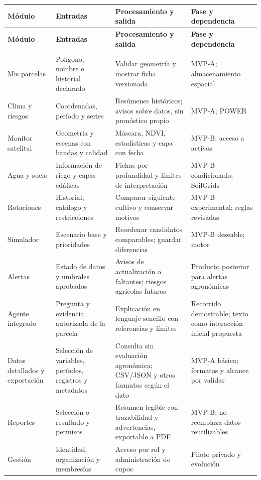 \documentclass[10pt,a4paper]{article}
\begin{document}
\begingroup\small
\begin{longtable}{>{\raggedright\arraybackslash}p{3.115cm}>{\raggedright\arraybackslash}p{3.582cm}>{\raggedright\arraybackslash}p{4.517cm}>{\raggedright\arraybackslash}p{4.361cm}}
\toprule
\textbf{Módulo} & \textbf{Entradas} & \textbf{Procesamiento y salida} & \textbf{Fase y dependencia} \\
\midrule\endfirsthead
\toprule
\textbf{Módulo} & \textbf{Entradas} & \textbf{Procesamiento y salida} & \textbf{Fase y dependencia} \\
\midrule\endhead
\midrule\multicolumn{4}{r}{\scriptsize Continúa en la página siguiente}\\\endfoot
\bottomrule\endlastfoot
Mis parcelas & Polígono, nombre e historial declarado & Validar geometría y mostrar ficha versionada & MVP-A; almacenamiento espacial \\[3pt]
Clima y riesgos & Coordenadas, período y series & Resúmenes históricos; avisos sobre datos, sin pronóstico propio & MVP-A; POWER \\[3pt]
Monitor satelital & Geometría y escenas con bandas y calidad & Máscara, NDVI, estadísticas y capa con fecha & MVP-B; acceso a activos \\[3pt]
Agua y suelo & Información de riego y capas edáficas & Fichas por profundidad y límites de interpretación & MVP-B condicionado; SoilGrids \\[3pt]
Rotaciones & Historial, catálogo y restricciones & Comparar siguiente cultivo y conservar motivos & MVP-B experimental; reglas revisadas \\[3pt]
Simulador & Escenario base y prioridades & Reordenar candidatos comparables; guardar diferencias & MVP-B deseable; motor \\[3pt]
Alertas & Estado de datos y umbrales aprobados & Avisos de actualización o faltantes; riesgos agrícolas futuros & Producto posterior para alertas agronómicas \\[3pt]
Agente integrado & Pregunta y evidencia autorizada de la parcela & Explicación en lenguaje sencillo con referencias y límites & Recorrido demostrable; texto como interacción inicial propuesta \\[3pt]
Datos detallados y exportación & Selección de variables, períodos, registros y metadatos & Consulta sin evaluación agronómica; CSV/\allowbreak{}JSON y otros formatos según el dato & MVP-A básico; formatos y alcance por validar \\[3pt]
Reportes & Selección o resultado y permisos & Resumen legible con trazabilidad y advertencias, exportable a PDF & MVP-B; no reemplaza datos reutilizables \\[3pt]
Gestión & Identidad, organización y membresías & Acceso por rol y administración de cupos & Piloto privado y evolución \\[3pt]
\end{longtable}
\endgroup
\end{document}

